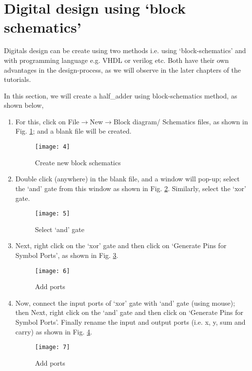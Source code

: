 \section{ Digital design using `block schematics'}
Digitals design can be create using two methods i.e. using `block-schematics' and with programming language e.g. VHDL or verilog etc. Both have their own advantages in the design-process, as we will observe in the later chapters of the tutorials. 

In this section, we will create a half\_adder using block-schematics method, as shown below,

\begin{enumerate}

\item For this, click on File$\rightarrow$New$\rightarrow$Block diagram/ Schematics files, as shown in Fig. \ref{fig:block_schematics}; and a blank file will be created.

\begin{figure}
	\centering
	\texttt{[image: 4]}
	\caption{Create new block schematics}
	\label{fig:block_schematics}
\end{figure}

\item Double click (anywhere) in the blank file, and a window will pop-up; select the `and' gate from this window as shown in Fig. \ref{fig:select_gate}. Similarly, select the `xor' gate. 

\begin{figure}
	\centering
	\texttt{[image: 5]}
	\caption{Select `and' gate}
	\label{fig:select_gate}
\end{figure}

\item Next, right click on the `xor' gate and then click on `Generate Pins for Symbol Ports', as shown in Fig. \ref{fig:add_pins}. 

\begin{figure}
	\centering
	\texttt{[image: 6]}
	\caption{Add ports}
	\label{fig:add_pins}
\end{figure}

\item Now, connect the input ports of `xor' gate with `and' gate (using mouse); then Next, right click on the `and' gate and then click on `Generate Pins for Symbol Ports'. Finally rename the input and output ports (i.e. x, y, sum and carry) as shown in Fig. \ref{fig:make_connections}. 

\begin{figure}
	\centering
	\texttt{[image: 7]}
	\caption{Add ports}
	\label{fig:make_connections}
\end{figure}


\end{enumerate}
